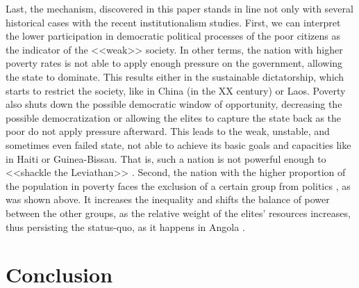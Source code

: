 \documentclass[a4paper, 12pt]{article}
\begin{document}
	\noindent Last, the mechanism, discovered in this paper stands in line not only with several historical cases with the recent institutionalism studies. First, we can interpret the lower participation in democratic political processes of the poor citizens as the indicator of the <<weak>> society. In other terms, the nation with higher poverty rates is not able to apply enough pressure on the government, allowing the state to dominate. This results either in the sustainable dictatorship, which starts to restrict the society, like in China (in the XX century) or Laos. Poverty also shuts down the possible democratic window of opportunity, decreasing the possible democratization or allowing the elites to capture the state back as the poor do not apply pressure afterward. This leads to the weak, unstable, and sometimes even failed state, not able to achieve its basic goals and capacities like in Haiti or Guinea-Bissau. That is, such a nation is not powerful enough to <<shackle the Leviathan>> \parencite{corridor}. Second, the nation with the higher proportion of the population in poverty faces the exclusion of a certain group from politics \parencite{exclusion}, as was shown above. It increases the inequality and shifts the balance of power between the other groups, as the relative weight of the elites' resources increases, thus persisting the status-quo, as it happens in Angola \parencite{inst_per}.
	
	
	\section{Conclusion}
	
\end{document}
